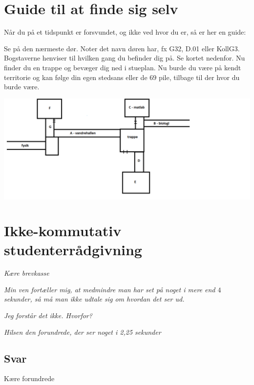 \begin{minipage}[t]{170mm}
\vspace{3mm}
\section*{Guide til at finde sig selv}
Når du på et tidspunkt er forsvundet, og ikke ved hvor du er, så er her en guide:

Se på den nærmeste dør. Noter det navn døren har, fx G32, D.01 eller KollG3. Bogstaverne henviser til hvilken gang du befinder dig på. Se kortet nedenfor. Nu finder du en trappe og bevæger dig ned i stueplan. Nu burde du være på kendt territorie og kan følge din egen stedsans eller de $69$ pile, tilbage til der hvor du burde være.
\begin{center}
\includegraphics[width=1.2\linewidth]{bogstav-kort.png}
\end{center}
\vspace{-9mm}
\section*{Ikke-kommutativ studenterrådgivning}
\emph{Kære brevkasse}

\emph{Min ven fortæller mig, at medmindre man har set på noget i mere end $4$ sekunder, så må man ikke udtale sig om hvordan det ser ud.}

\emph{Jeg forstår det ikke. Hvorfor?}

\emph{Hilsen den forundrede, der ser noget i 2,25 sekunder}

\subsection*{Svar}
Kære forundrede


\end{minipage}
